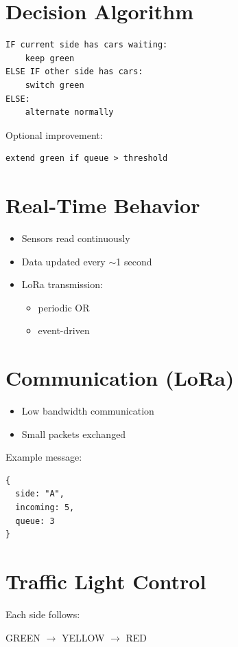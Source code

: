 \documentclass[11pt]{article}
\begin{document}
\section{Decision Algorithm}

\begin{lstlisting}
IF current side has cars waiting:
    keep green
ELSE IF other side has cars:
    switch green
ELSE:
    alternate normally
\end{lstlisting}

Optional improvement:
\begin{lstlisting}
extend green if queue > threshold
\end{lstlisting}

\section{Real-Time Behavior}

\begin{itemize}
    \item Sensors read continuously
    \item Data updated every $\sim$1 second
    \item LoRa transmission:
    \begin{itemize}
        \item periodic OR
        \item event-driven
    \end{itemize}
\end{itemize}

\section{Communication (LoRa)}

\begin{itemize}
    \item Low bandwidth communication
    \item Small packets exchanged
\end{itemize}

Example message:
\begin{lstlisting}
{
  side: "A",
  incoming: 5,
  queue: 3
}
\end{lstlisting}

\section{Traffic Light Control}

Each side follows:
\begin{center}
GREEN $\rightarrow$ YELLOW $\rightarrow$ RED
\end{center}
\end{document}
